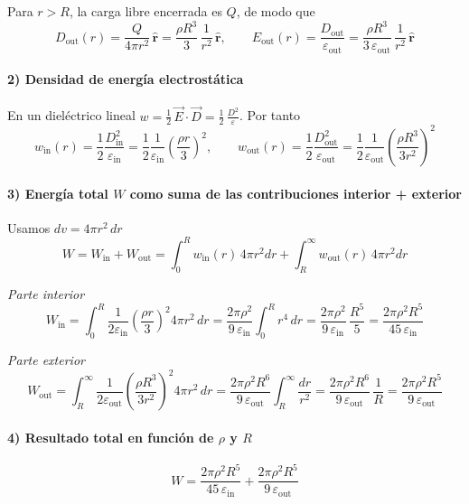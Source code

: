 \documentclass{article}
\begin{document}
Para \(r>R\), la carga libre encerrada es \(Q\), de modo que
\[
D_{\text{out}}(r)=\frac{Q}{4\pi r^{2}}\,\hat{\boldsymbol r}
=\frac{\rho R^{3}}{3}\,\frac{1}{r^{2}}\,\hat{\boldsymbol r},\qquad
E_{\text{out}}(r)=\frac{D_{\text{out}}}{\varepsilon_{\text{out}}}
=\frac{\rho R^{3}}{3\,\varepsilon_{\text{out}}}\,\frac{1}{r^{2}}\,\hat{\boldsymbol r}
\]

\paragraph{2) Densidad de energía electrostática}
En un dieléctrico lineal \(w=\tfrac12\,\vec E\cdot\vec D=\tfrac{1}{2}\,\frac{D^{2}}{\varepsilon}\). Por tanto
\[
w_{\text{in}}(r)=\frac{1}{2}\frac{D_{\text{in}}^{2}}{\varepsilon_{\text{in}}}
=\frac{1}{2}\frac{1}{\varepsilon_{\text{in}}}\left(\frac{\rho r}{3}\right)^{2},\qquad
w_{\text{out}}(r)=\frac{1}{2}\frac{D_{\text{out}}^{2}}{\varepsilon_{\text{out}}}
=\frac{1}{2}\frac{1}{\varepsilon_{\text{out}}}\left(\frac{\rho R^{3}}{3r^{2}}\right)^{2}
\]

\paragraph{3) Energía total \(W\) como suma de las contribuciones interior + exterior}
Usamos \(d v=4\pi r^{2}\,dr\)
\[
W=W_{\text{in}}+W_{\text{out}}
=\int_{0}^{R} w_{\text{in}}(r)\,4\pi r^{2}dr
+\int_{R}^{\infty} w_{\text{out}}(r)\,4\pi r^{2}dr
\]

\emph{Parte interior}
\[
W_{\text{in}}=\int_{0}^{R}\frac{1}{2\varepsilon_{\text{in}}}
\left(\frac{\rho r}{3}\right)^{2}4\pi r^{2}\,dr
=\frac{2\pi\rho^{2}}{9\,\varepsilon_{\text{in}}}\int_{0}^{R}r^{4}\,dr
=\frac{2\pi\rho^{2}}{9\,\varepsilon_{\text{in}}}\,\frac{R^{5}}{5}
=\frac{2\pi\rho^{2}R^{5}}{45\,\varepsilon_{\text{in}}}
\]

\emph{Parte exterior}
\[
W_{\text{out}}=\int_{R}^{\infty}\frac{1}{2\varepsilon_{\text{out}}}
\left(\frac{\rho R^{3}}{3r^{2}}\right)^{2}4\pi r^{2}\,dr
=\frac{2\pi\rho^{2}R^{6}}{9\,\varepsilon_{\text{out}}}\int_{R}^{\infty}\frac{dr}{r^{2}}
=\frac{2\pi\rho^{2}R^{6}}{9\,\varepsilon_{\text{out}}}\,\frac{1}{R}
=\frac{2\pi\rho^{2}R^{5}}{9\,\varepsilon_{\text{out}}}
\]

\paragraph{4) Resultado total en función de \(\rho\) y \(R\)}
\[
\boxed{\,W
=\frac{2\pi\rho^{2}R^{5}}{45\,\varepsilon_{\text{in}}}
+\frac{2\pi\rho^{2}R^{5}}{9\,\varepsilon_{\text{out}}}\,}
\]
\end{document}
